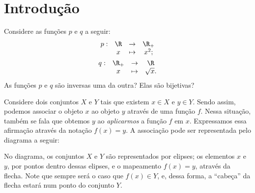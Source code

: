 \section{Introdução}

Considere as funções $p$ e $q$ a seguir:
%
\begin{gather*}
\begin{array}{cccc}
p : & \R & \to     & \R_+ \\
     &  x & \mapsto & x^2;
\end{array}\\
\begin{array}{cccc}
q : & \R_+ & \to     & \R \\
     &  x & \mapsto & \sqrt x.
\end{array}
\end{gather*}
As funções $p$ e $q$ são inversas uma da outra?  Elas são bijetivas?

Considere dois conjuntos $X$ e $Y$ tais que existem $x \in X$ e $y \in Y$. Sendo assim, podemos associar o objeto $x$ ao objeto $y$ através de uma função $f$. Nessa situação, também se fala que obtemos $y$ ao \emph{aplicarmos} a função $f$ em $x$. Expressamos essa afirmação através da notação $f(x) = y$. A associação pode ser representada pelo diagrama a seguir:
%
\begin{center}
\end{center}
%
No diagrama, os conjuntos $X$ e $Y$ são representados por elipses; os elementos $x$ e $y$, por pontos dentro dessas elipses, e o mapeamento $f(x) = y$, através da flecha. Note que sempre será o caso que $f(x) \in Y$, e, dessa forma, a ``cabeça'' da flecha estará num ponto do conjunto $Y$.